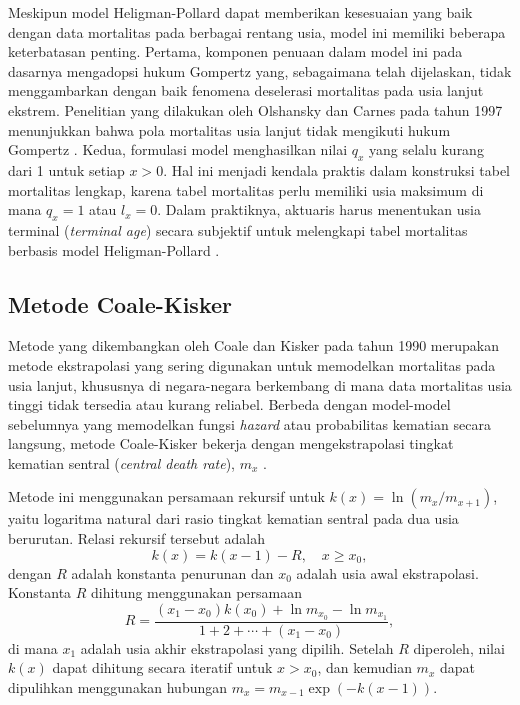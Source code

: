 Meskipun model Heligman-Pollard dapat memberikan kesesuaian yang baik dengan data mortalitas pada berbagai rentang usia, model ini memiliki beberapa keterbatasan penting. Pertama, komponen penuaan dalam model ini pada dasarnya mengadopsi hukum Gompertz yang, sebagaimana telah dijelaskan, tidak menggambarkan dengan baik fenomena deselerasi mortalitas pada usia lanjut ekstrem. Penelitian yang dilakukan oleh Olshansky dan Carnes pada tahun 1997 menunjukkan bahwa pola mortalitas usia lanjut tidak mengikuti hukum Gompertz \citep{olshansky1997ever}. Kedua, formulasi model menghasilkan nilai $q_x$ yang selalu kurang dari 1 untuk setiap $x > 0$. Hal ini menjadi kendala praktis dalam konstruksi tabel mortalitas lengkap, karena tabel mortalitas perlu memiliki usia maksimum di mana $q_x = 1$ atau $l_x = 0$. Dalam praktiknya, aktuaris harus menentukan usia terminal (\textit{terminal age}) secara subjektif untuk melengkapi tabel mortalitas berbasis model Heligman-Pollard \citep{huang2020modelling}.

\subsection{Metode Coale-Kisker}

Metode yang dikembangkan oleh Coale dan Kisker pada tahun 1990 merupakan metode ekstrapolasi yang sering digunakan untuk memodelkan mortalitas pada usia lanjut, khususnya di negara-negara berkembang di mana data mortalitas usia tinggi tidak tersedia atau kurang reliabel. Berbeda dengan model-model sebelumnya yang memodelkan fungsi \textit{hazard} atau probabilitas kematian secara langsung, metode Coale-Kisker bekerja dengan mengekstrapolasi tingkat kematian sentral (\textit{central death rate}), $m_x$ \citep{coale1990defects}.

Metode ini menggunakan persamaan rekursif untuk $k(x) = \ln(m_x / m_{x+1})$, yaitu logaritma natural dari rasio tingkat kematian sentral pada dua usia berurutan. Relasi rekursif tersebut adalah
\begin{equation}
    k(x) = k(x-1) - R, \quad x \geq x_0,
\end{equation}
dengan $R$ adalah konstanta penurunan dan $x_0$ adalah usia awal ekstrapolasi. Konstanta $R$ dihitung menggunakan persamaan
\begin{equation}
    R = \frac{(x_1 - x_0) k(x_0) + \ln m_{x_0} - \ln m_{x_1}}{1 + 2 + \cdots + (x_1 - x_0)},
\end{equation}
di mana $x_1$ adalah usia akhir ekstrapolasi yang dipilih. Setelah $R$ diperoleh, nilai $k(x)$ dapat dihitung secara iteratif untuk $x > x_0$, dan kemudian $m_x$ dapat dipulihkan menggunakan hubungan $m_x = m_{x-1} \exp(-k(x-1))$.

